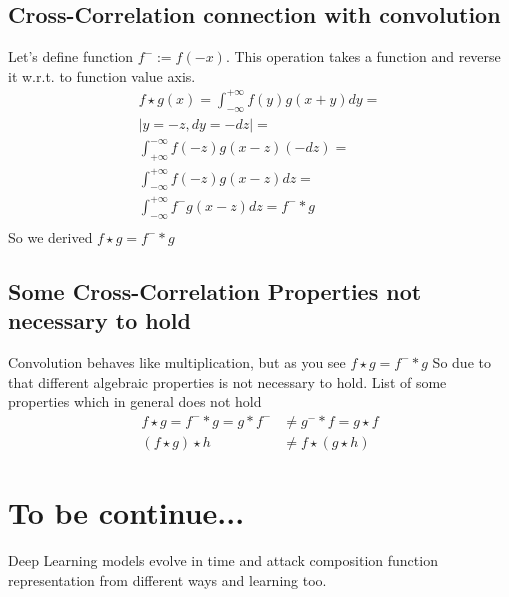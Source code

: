 \documentclass[12pt,a4paper]{article}
\theoremstyle{plain}
\begin{document}
\subsection{Cross-Correlation connection with convolution}
Let's define function $f^{-}:=f(-x)$. This operation takes a function and reverse it w.r.t. to function value axis.
\begin{multline}
f \star g(x)=\int^{+\infty}_{-\infty} f(y)g(x+y)dy=\\
|y=-z,dy=-dz|=\\
\int^{-\infty}_{+\infty} f(-z)g(x-z)(-dz)=\\
\int^{+\infty}_{-\infty} f(-z)g(x-z)dz=\\
\int^{+\infty}_{-\infty} f^{-}g(x-z)dz=f^{-}*g\\
\end{multline}
So we derived $f \star g=f^{-}*g$
\subsection{Some Cross-Correlation Properties not necessary to hold}
Convolution behaves like multiplication, but as you see $f \star g=f^{-}*g$
So due to that different algebraic properties is not necessary to hold.
List of some properties which in general does not hold
\begin{align}
f \star g =f^-*g = g*f^- &\ne g^-*f= g \star f\\
(f \star g) \star h &\ne f \star (g \star h)
\end{align}
\section{To be continue...}
Deep Learning models evolve in time and attack composition function representation from different ways and learning too.
\end{document}
